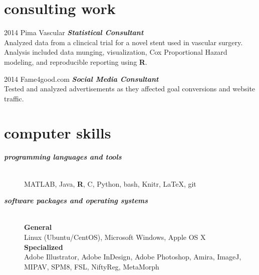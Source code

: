 \documentclass[]{friggeri-cv} %
\begin{document}
\section{consulting work}
\begin{entrylist}
\entry
{\footnotesize{2014}}
{Pima Vascular}
{}
{\textbf{\emph{Statistical Consultant}} \\
Analyzed data from a clincical trial for a novel stent used in vascular surgery. 
Analysis included data munging, visualization, Cox Proportional Hazard modeling, 
and reproducible reporting using \textbf{R}.}
\end {entrylist}

\begin{entrylist}
\entry
{\footnotesize{2014}}
{Fame4good.com}
{}
{\textbf{\emph{Social Media Consultant}} \\
Tested and analyzed advertisements as they affected goal conversions and website traffic.}
\end {entrylist}


\section{computer skills}
\begin{description}
   \item[\textbf{\textit{programming languages and tools}}] \hfill \\  
	 MATLAB, Java, \textbf{R}, C, Python, bash, Knitr, \LaTeX, git
   \item[\textbf{\textit{software packages and operating systems}}] \hfill \\
	    \textbf{General} \\
		Linux (Ubuntu/CentOS), Microsoft Windows, Apple OS X \\
	    \textbf{Specialized} \\
	    Adobe Illustrator, Adobe InDesign, Adobe Photoshop, Amira, ImageJ, MIPAV, SPM8, FSL, NiftyReg, MetaMorph 
\end{description}
\end{document}
